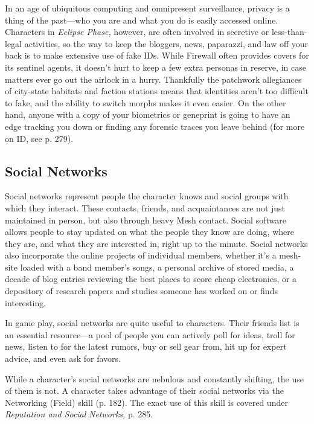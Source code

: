 In an age of ubiquitous computing and omnipresent 
surveillance, privacy is a thing of the past—who you 
are and what you do is easily accessed online. Characters
in \textit{Eclipse Phase,} however, are often involved
in secretive or less-than-legal activities, so the way to 
keep the bloggers, news, paparazzi, and law off your 
back is to make extensive use of fake IDs. While Firewall
often provides covers for its sentinel agents, it
doesn't hurt to keep a few extra personas in reserve, in 
case matters ever go out the airlock in a hurry. Thankfully
the patchwork allegiances of city-state habitats
and faction stations means that identities aren't too 
difficult to fake, and the ability to switch morphs 
makes it even easier. On the other hand, anyone with a 
copy of your biometrics or geneprint is going to have 
an edge tracking you down or finding any forensic 
traces you leave behind (for more on ID, see p. 279).

\subsection{Social Networks}

Social networks represent people the character knows 
and social groups with which they interact. These 
contacts, friends, and acquaintances are not just maintained
in person, but also through heavy Mesh contact.
Social software allows people to stay updated on what 
the people they know are doing, where they are, and 
what they are interested in, right up to the minute. 
Social networks also incorporate the online projects 
of individual members, whether it's a mesh-site loaded 
with a band member's songs, a personal archive of 
stored media, a decade of blog entries reviewing the 
best places to score cheap electronics, or a depository 
of research papers and studies someone has worked 
on or finds interesting.

In game play, social networks are quite useful 
to characters. Their friends list is an essential 
resource—a pool of people you can actively poll for 
ideas, troll for news, listen to for the latest rumors, 
buy or sell gear from, hit up for expert advice, and 
even ask for favors.

While a character's social networks are nebulous 
and constantly shifting, the use of them is not. A 
character takes advantage of their social networks via 
the Networking (Field) skill (p. 182). The exact use 
of this skill is covered under \textit{Reputation and Social }
\textit{Networks,} p. 285.

